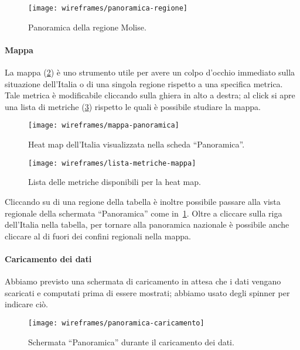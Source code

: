 \begin{figure}[H]
    \centering
    \texttt{[image: wireframes/panoramica-regione]}
    \caption{Panoramica della regione Molise.}\label{fig:panoramica-regione}
\end{figure}

\paragraph{Mappa}
La mappa (\ref{fig:mappa-panoramica}) è uno strumento utile per avere un colpo d'occhio immediato sulla situazione dell'Italia o di una singola regione rispetto a una specifica metrica. Tale metrica è modificabile cliccando sulla ghiera in alto a destra; al click si apre una lista di metriche (\ref{fig:lista-metriche-mappa}) rispetto le quali è possibile studiare la mappa.
\begin{figure}[H]
    \centering
    \texttt{[image: wireframes/mappa-panoramica]}
    \caption{Heat map dell'Italia visualizzata nella scheda ``Panoramica''.}\label{fig:mappa-panoramica}
\end{figure}

\begin{figure}[H]
    \centering
    \texttt{[image: wireframes/lista-metriche-mappa]}
    \caption{Lista delle metriche disponibili per la heat map.}\label{fig:lista-metriche-mappa}
\end{figure}

Cliccando su di una regione della tabella è inoltre possibile passare alla vista regionale della schermata ``Panoramica'' come in~\ref{fig:panoramica-regione}. Oltre a cliccare sulla riga dell'Italia nella tabella, per tornare alla panoramica nazionale è possibile anche cliccare al di fuori dei confini regionali nella mappa.

\paragraph{Caricamento dei dati}
Abbiamo previsto una schermata di caricamento in attesa che i dati vengano scaricati e computati prima di essere mostrati; abbiamo usato degli spinner per indicare ciò.
\begin{figure}[H]
    \centering
    \texttt{[image: wireframes/panoramica-caricamento]}
    \caption{Schermata ``Panoramica'' durante il caricamento dei dati.}\label{fig:panoramica-caricamento}
\end{figure}


